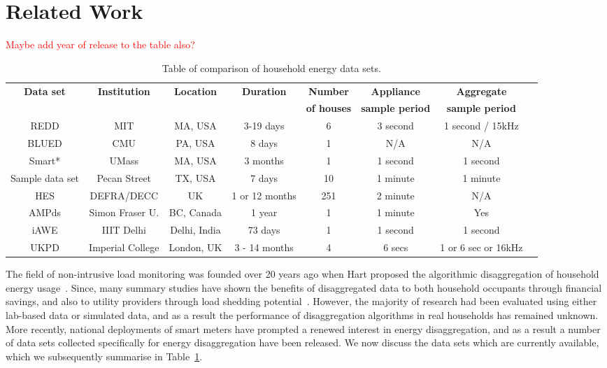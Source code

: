 \documentclass{sig-alternate}
\newcommand{\redcolor}[1]{\textcolor{red}{#1}}
\newcommand{\tabref}[1]{Table~\ref{#1}}
\begin{document}
\section{Related Work}
\label{sec:related}

\redcolor{Maybe add year of release to the table also?}

\begin{table}[]
  \centering
  \begin{tabular}{c c c c c c c c}
    \hline
    \bf Data set & \bf Institution & \bf Location & \bf Duration & \bf Number & \bf Appliance & \bf Aggregate\\
    \bf  & \bf  & \bf  & \bf  & \bf of houses & \bf sample period & \bf sample period\\
    \hline
    REDD & MIT & MA, USA & 3-19 days & 6 & 3 second & 1 second / 15kHz\\
    BLUED & CMU & PA, USA & 8 days & 1 & N/A & N/A\\
    Smart* & UMass & MA, USA & 3 months & 1 & 1 second & 1 second\\
    Sample data set & Pecan Street & TX, USA & 7 days & 10 & 1 minute & 1 minute\\
    HES & DEFRA/DECC & UK & 1 or 12 months & 251 & 2 minute & N/A\\
    AMPds & Simon Fraser U. & BC, Canada & 1 year & 1 & 1 minute & Yes\\
    iAWE & IIIT Delhi & Delhi, India & 73 days & 1 & 1 second & 1 second\\
    UKPD & Imperial College & London, UK & 3 - 14 months & 4 & 6 secs & 1 or 6 sec or 16kHz \\
    \hline
  \end{tabular}
  \caption{Table of comparison of household energy data sets.}
  \label{table:datasets}
\end{table}

The field of non-intrusive load monitoring was founded over 20 years ago when Hart proposed the algorithmic disaggregation of household energy usage~\cite{hart_1992}. Since, many summary studies have shown the benefits of disaggregated data to both household occupants through financial savings, and also to utility providers through load shedding potential~\cite{zeifman_2011,armel_2013}. However, the majority of research had been evaluated using either lab-based data or simulated data, and as a result the performance of disaggregation algorithms in real households has remained unknown. More recently, national deployments of smart meters have prompted a renewed interest in energy disaggregation, and as a result a number of data sets collected specifically for energy disaggregation have been released. We now discuss the data sets which are currently available, which we subsequently summarise in \tabref{table:datasets}.
\end{document}

